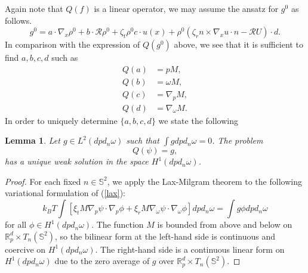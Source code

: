 \documentclass[reqno]{amsart}
\numberwithin{equation}{section}
\newtheorem{Lemma}{Lemma}[section]
\theoremstyle{definition}
\theoremstyle{remark}
\begin{document}
Again note that  $Q(f)$ is a linear operator, we may assume the
ansatz for $g^0$ as follows.
$$
g^0=a\cdot \nabla_x \rho^0 +b\cdot \mathcal{R }\rho^0+\zeta_t \rho^0
c\cdot u(x) +\rho^0 (\zeta_r  n\times \nabla_x u \cdot n -\mathcal{R}U)\cdot d.
$$
In comparison with the expression of $Q(g^0)$ above, we see that it
is sufficient to find $a, b, c, d$ such as
\begin{align*}
Q(a)& =pM, \\
Q(b)&=\omega M,\\
Q(c)&=\nabla_p M,\\
Q(d) &=\nabla_\omega M.
\end{align*}
In order to uniquely determine $\{a, b, c, d\}$  we state the
following
\begin{Lemma}\label{lem3.5} Let $g\in L^2(dpd_n\omega)$ such that $\int g
dpd_n\omega=0$. The problem
\begin{equation}\label{lax}
    Q(\psi)=g,
\end{equation}
has a unique weak solution in the space $H^1(dpd_n\omega)$.
\end{Lemma}
\begin{proof}For each fixed $n\in \mathbb{S}^2$,
we apply the Lax-Milgram theorem to the following variational
formulation of (\ref{lax}):
\begin{equation}\label{var}
k_BT\int \left[\xi_t M\nabla_p \psi \cdot \nabla_p \phi +\xi_r M
\nabla_\omega\psi \cdot  \nabla_\omega \phi \right]dpd_n\omega=\int
g\phi dpd_n\omega
\end{equation}
for all $\phi\in H^1(dpd_n\omega)$. The function $M$ is bounded from
above and below on $\mathbb{R}_p^d \times T_n(\mathbb{S}^2)$, so the
bilinear form at the left-hand side is continuous and coercive on
$H^1(dpd_n\omega)$. The right-hand side is a continuous linear form
on $H^1(dpd_n\omega)$ due to the zero average of $g$ over
$\mathbb{R}_p^d \times T_n(\mathbb{S}^2)$.
\end{proof}
\end{document}
